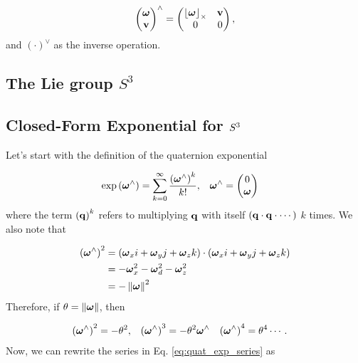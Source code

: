 \[
\begin{pmatrix}\boldsymbol{\omega}\\
\mathbf{v}
\end{pmatrix}^{\wedge}=\begin{pmatrix}\left\lfloor\boldsymbol{\omega}\right\rfloor_{\times} & \mathbf{v}\\
0 & 0
\end{pmatrix},
\]
and $\left(\cdot\right)^{\vee}$ as the inverse operation.



\subsection{The Lie group $S^3$}


\subsection{Closed-Form Exponential for $\protect S^{3}$}

Let's start with the definition of the quaternion exponential

\begin{align}
\exp\left(\omegabf^{\wedge}\right) & =\sum_{k=0}^{\infty}\frac{\left(\omegabf^{\wedge}\right)^{k}}{k!}, & \omegabf^{\wedge} & =\begin{pmatrix}0\\
\omegabf
\end{pmatrix}\label{eq:quat_exp_series}
\end{align}
where the term $\left(\mathbf{q}\right)^{k}$ refers to multiplying $\mathbf{q}$
with itself $\left(\mathbf{q}\cdot\mathbf{q}\cdot\cdots\right)$ $k$ times. We also
note that

\begin{align*}
\left(\boldsymbol{\omega}^{\wedge}\right)^{2} & =\left(\boldsymbol{\omega}_{x}i+\boldsymbol{\omega}_{y}j+\boldsymbol{\omega}_{z}k\right)\cdot\left(\boldsymbol{\omega}_{x}i+\boldsymbol{\omega}_{y}j+\boldsymbol{\omega}_{z}k\right)\\
 & =-\boldsymbol{\omega}_{x}^{2}-\boldsymbol{\omega}_{d}^{2}-\boldsymbol{\omega}_{z}^{2}\\
 & =-\left\|\boldsymbol{\omega}\right\|^{2}
\end{align*}
Therefore, if $\theta=\left\|\boldsymbol{\omega}\right\|$, then

\begin{align*}
\left(\boldsymbol{\omega}^{\wedge}\right)^{2} & =-\theta^{2}, & \left(\boldsymbol{\omega}^{\wedge}\right)^{3} & =-\theta^{2}\boldsymbol{\omega}^{\wedge} & \left(\boldsymbol{\omega}^{\wedge}\right)^{4} & =\theta^{4}\cdots.
\end{align*}
Now, we can rewrite the series in Eq. \ref{eq:quat_exp_series} as

